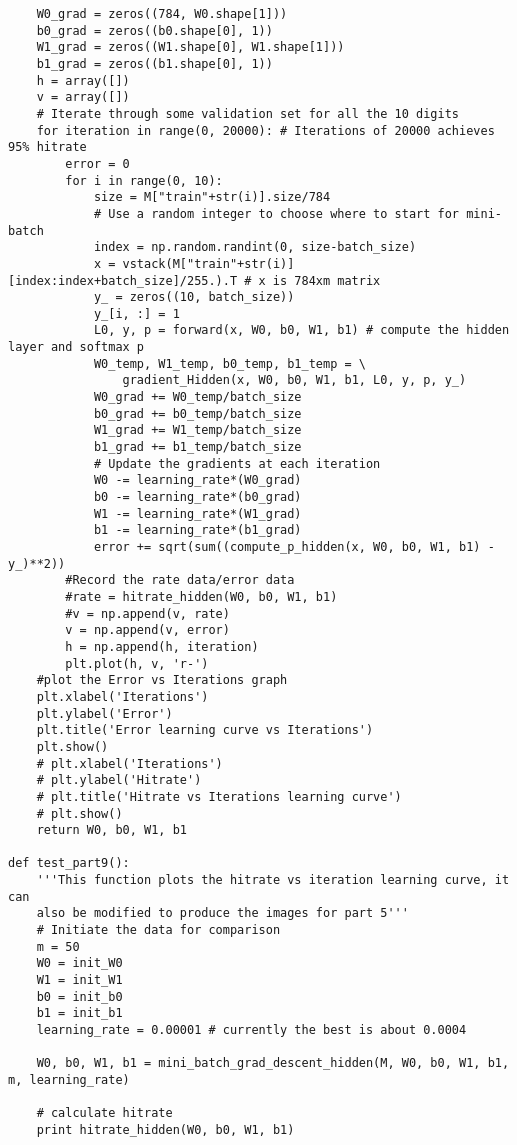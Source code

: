 \documentclass{article}
\begin{document}
\begin{lstlisting}
    W0_grad = zeros((784, W0.shape[1]))
    b0_grad = zeros((b0.shape[0], 1))    
    W1_grad = zeros((W1.shape[0], W1.shape[1]))
    b1_grad = zeros((b1.shape[0], 1))
    h = array([])
    v = array([])
    # Iterate through some validation set for all the 10 digits
    for iteration in range(0, 20000): # Iterations of 20000 achieves 95% hitrate
        error = 0
        for i in range(0, 10):
            size = M["train"+str(i)].size/784
            # Use a random integer to choose where to start for mini-batch
            index = np.random.randint(0, size-batch_size)
            x = vstack(M["train"+str(i)][index:index+batch_size]/255.).T # x is 784xm matrix
            y_ = zeros((10, batch_size))
            y_[i, :] = 1
            L0, y, p = forward(x, W0, b0, W1, b1) # compute the hidden layer and softmax p
            W0_temp, W1_temp, b0_temp, b1_temp = \
                gradient_Hidden(x, W0, b0, W1, b1, L0, y, p, y_)
            W0_grad += W0_temp/batch_size
            b0_grad += b0_temp/batch_size
            W1_grad += W1_temp/batch_size
            b1_grad += b1_temp/batch_size
            # Update the gradients at each iteration
            W0 -= learning_rate*(W0_grad)
            b0 -= learning_rate*(b0_grad)
            W1 -= learning_rate*(W1_grad)
            b1 -= learning_rate*(b1_grad)
            error += sqrt(sum((compute_p_hidden(x, W0, b0, W1, b1) - y_)**2))
        #Record the rate data/error data
        #rate = hitrate_hidden(W0, b0, W1, b1)
        #v = np.append(v, rate)
        v = np.append(v, error)
        h = np.append(h, iteration)
        plt.plot(h, v, 'r-')
    #plot the Error vs Iterations graph
    plt.xlabel('Iterations')
    plt.ylabel('Error')
    plt.title('Error learning curve vs Iterations')
    plt.show()
    # plt.xlabel('Iterations')
    # plt.ylabel('Hitrate')
    # plt.title('Hitrate vs Iterations learning curve')
    # plt.show()
    return W0, b0, W1, b1
    
def test_part9():
    '''This function plots the hitrate vs iteration learning curve, it can 
    also be modified to produce the images for part 5'''
    # Initiate the data for comparison
    m = 50
    W0 = init_W0
    W1 = init_W1
    b0 = init_b0
    b1 = init_b1
    learning_rate = 0.00001 # currently the best is about 0.0004

    W0, b0, W1, b1 = mini_batch_grad_descent_hidden(M, W0, b0, W1, b1, m, learning_rate)

    # calculate hitrate
    print hitrate_hidden(W0, b0, W1, b1)


\end{lstlisting}
\end{document}
